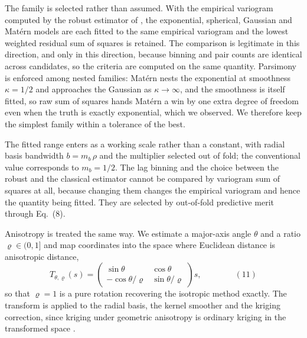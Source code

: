 \documentclass[preprint,12pt,authoryear]{elsarticle}
\newcommand{\eqnum}[1]{\qquad\qquad\mathrm{(#1)}}
\begin{document}
The family is selected rather than assumed. With the empirical variogram
computed by the robust estimator of \citet{cressie1980}, the exponential,
spherical, Gaussian and Mat\'ern models \citep{matheron1963,journel1978} are
each fitted to the same empirical variogram and the lowest weighted residual sum
of squares is retained. The comparison is legitimate in this direction, and only
in this direction, because binning and pair counts are identical across
candidates, so the criteria are computed on the same quantity. Parsimony is
enforced among nested families: Mat\'ern nests the exponential at smoothness
$\kappa = 1/2$ and approaches the Gaussian as $\kappa \rightarrow \infty$, and
the smoothness is itself fitted, so raw sum of squares hands Mat\'ern a win by
one extra degree of freedom even when the truth is exactly exponential, which we
observed. We therefore keep the simplest family within a tolerance of the best.

The fitted range enters as a working scale rather than a constant, with radial
basis bandwidth $b = m_b\,\rho$ and the multiplier selected out of fold; the
conventional value corresponds to $m_b = 1/2$. The lag binning and the choice
between the robust and the classical \citep{matheron1963} estimator cannot be
compared by variogram sum of squares at all, because changing them changes the
empirical variogram and hence the quantity being fitted. They are selected by
out-of-fold predictive merit through Eq.~(8).

Anisotropy is treated the same way. We estimate a major-axis angle $\theta$ and
a ratio $\varrho \in (0,1]$ and map coordinates into the space where Euclidean
distance is anisotropic distance,
\[
T_{\theta,\varrho}(s) =
\begin{pmatrix}
\sin\theta & \cos\theta \\[2pt]
-\cos\theta/\varrho & \sin\theta/\varrho
\end{pmatrix} s ,
\eqnum{11}
\]
so that $\varrho = 1$ is a pure rotation recovering the isotropic method
exactly. The transform is applied to the radial basis, the kernel smoother and
the kriging correction, since kriging under geometric anisotropy is ordinary
kriging in the transformed space \citep{journel1978}.
\end{document}
